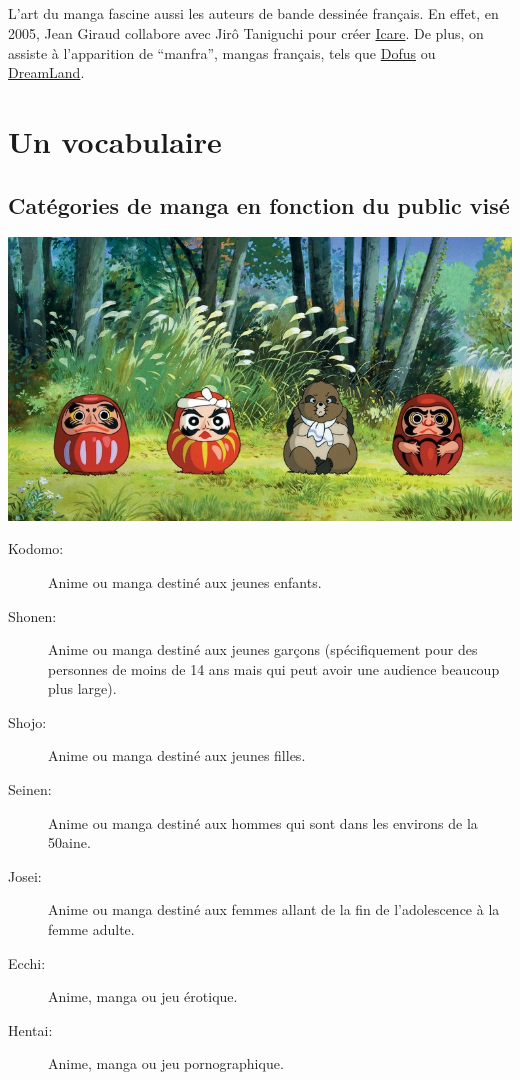 \paragraph{} L'art du manga fascine aussi les auteurs de bande dessinée
français. En effet, en 2005, Jean Giraud collabore avec Jirô Taniguchi pour
créer \underline{Icare}. De plus, on assiste à l'apparition de ``manfra'',
mangas français, tels que \underline{Dofus} ou \underline{DreamLand}.

\chapter{Un vocabulaire}

\section[Publics visés]{Catégories de manga en fonction du public visé}

\begin{center}
	\includegraphics[scale=0.5]{Kodomo.jpg}
\end{center}

\begin{description}
	\item[Kodomo:] Anime ou manga destiné aux jeunes enfants.
	\item[Shonen:] Anime ou manga destiné aux jeunes garçons (spécifiquement
		pour des personnes de moins de 14 ans mais qui peut avoir une audience
		beaucoup plus large).
	\item[Shojo:] Anime ou manga destiné aux jeunes filles.
	\item[Seinen:] Anime ou manga destiné aux hommes qui sont dans les environs
		de la 50aine.
	\item[Josei:] Anime ou manga destiné aux femmes allant de la fin de
		l'adolescence à la femme adulte.
	\item[Ecchi:] Anime, manga ou jeu érotique.
	\item[Hentai:] Anime, manga ou jeu pornographique.
\end{description}


